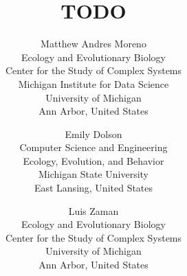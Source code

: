 \title{ TODO }

\author{
Matthew Andres Moreno\\
Ecology and Evolutionary Biology \\
Center for the Study of Complex Systems \\
Michigan Institute for Data Science \\
University of Michigan\\
Ann Arbor, United States \\
\and
Emily Dolson\\
Computer Science and Engineering \\
Ecology, Evolution, and Behavior \\
Michigan State University\\
East Lansing, United States \\
\and
Luis Zaman\\
Ecology and Evolutionary Biology \\
Center for the Study of Complex Systems \\
University of Michigan\\
Ann Arbor, United States \\
}

\maketitle
